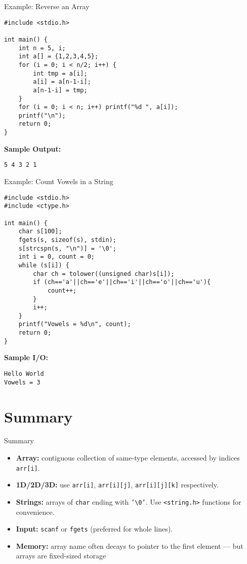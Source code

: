 \documentclass[12pt, aspectratio=169]{beamer}
\begin{document}
    \begin{frame}[fragile]{Example: Reverse an Array}
        \begin{verbatim}
#include <stdio.h>

int main() {
    int n = 5, i;
    int a[] = {1,2,3,4,5};
    for (i = 0; i < n/2; i++) {
        int tmp = a[i];
        a[i] = a[n-1-i];
        a[n-1-i] = tmp;
    }
    for (i = 0; i < n; i++) printf("%d ", a[i]);
    printf("\n");
    return 0;
}
        \end{verbatim}

        \textbf{Sample Output:}
        \begin{verbatim}
5 4 3 2 1
        \end{verbatim}
    \end{frame}

    \begin{frame}[fragile]{Example: Count Vowels in a String}
        \begin{verbatim}
#include <stdio.h>
#include <ctype.h>

int main() {
    char s[100];
    fgets(s, sizeof(s), stdin);
    s[strcspn(s, "\n")] = '\0';
    int i = 0, count = 0;
    while (s[i]) {
        char ch = tolower((unsigned char)s[i]);
        if (ch=='a'||ch=='e'||ch=='i'||ch=='o'||ch=='u'){
            count++;
        }
        i++;
    }
    printf("Vowels = %d\n", count);
    return 0;
}
        \end{verbatim}

        \textbf{Sample I/O:}
        \begin{verbatim}
Hello World
Vowels = 3
        \end{verbatim}
    \end{frame}


    \section{Summary}


    \begin{frame}{Summary}
        \begin{itemize}
            \item \textbf{Array:} contiguous collection of same-type elements, accessed by indices \texttt{arr[i]}.
            \item \textbf{1D/2D/3D:} use \texttt{arr[i]}, \texttt{arr[i][j]}, \texttt{arr[i][j][k]} respectively.
            \item \textbf{Strings:} arrays of \texttt{char} ending with \texttt{'\textbackslash0'}. Use \texttt{<string.h>} functions for convenience.
            \item \textbf{Input:} \texttt{scanf} or \texttt{fgets} (preferred for whole lines).
            \item \textbf{Memory:} array name often decays to pointer to the first element — but arrays are fixed-sized storage
        \end{itemize}
    \end{frame}
\end{document}

